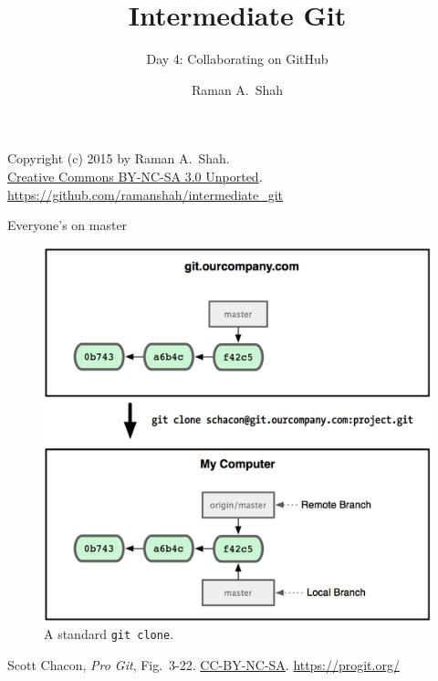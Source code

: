 

\title{Intermediate Git}
\subtitle{Day 4: Collaborating on GitHub}
\author{Raman A.~Shah}
\date{}



\begin{frame}[plain]
  \titlepage
  \footnotesize{Copyright (c) 2015 by Raman A.~Shah.\\
  \href{https://creativecommons.org/licenses/by-nc-sa/3.0/legalcode}
       {Creative Commons BY-NC-SA 3.0 Unported}.\\
   \href{https://github.com/ramanshah/intermediate\_git}
        {https://github.com/ramanshah/intermediate\_git}}
\end{frame}

\begin{frame}{Everyone's on master}
  \begin{figure}
    \includegraphics[scale=0.8]{18333fig0322-tn.png}
    \\ A standard \texttt{git clone}.
  \end{figure}
  \footnotesize{Scott Chacon,
    \emph{Pro Git},
    Fig.~3-22.
    \href{https://creativecommons.org/licenses/by-nc-sa/3.0/legalcode}{CC-BY-NC-SA}.
    \href{https://progit.org/}{https://progit.org/}}
\end{frame}

